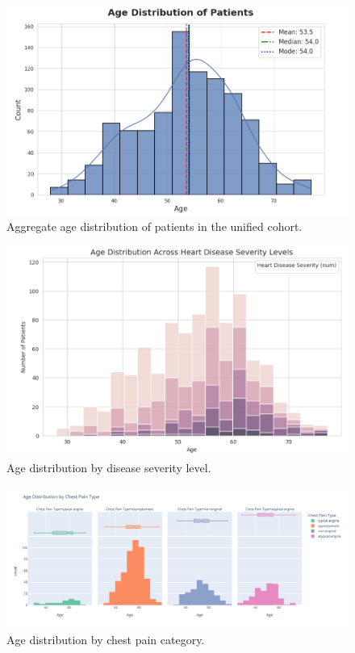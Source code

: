 \documentclass[conference]{IEEEtran}
\begin{document}
\begin{figure}[t]
  \centering
  \includegraphics[width=0.85\linewidth]{age_distribution_of_patients.png}
  \caption{Aggregate age distribution of patients in the unified cohort.}
  \label{fig:age_overall}
\end{figure}

\begin{figure}[t]
  \centering
  \includegraphics[width=0.85\linewidth]{age_distribution_by_severity_levels.png}
  \caption{Age distribution by disease severity level.}
  \label{fig:age_severity}
\end{figure}

\begin{figure}[t]
  \centering
  \includegraphics[width=0.85\linewidth]{age_distribution_by_chest_pain_type.png}
  \caption{Age distribution by chest pain category.}
  \label{fig:age_cp}
\end{figure}
\end{document}
